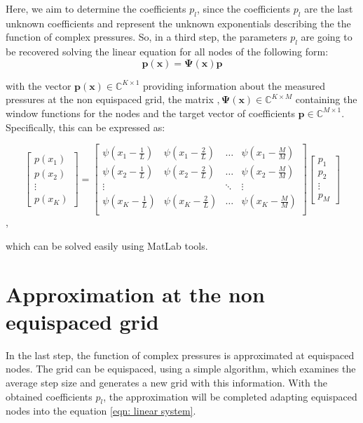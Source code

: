\documentclass[11pt]{report} %
\begin{document}
Here, we aim to determine the coefficients $p_l$, since the coefficients $p_l$ are the last unknown coefficients and represent the unknown exponentials describing the the function of complex pressures.
So, in a third step, the parameters $p_l$ are going to be recovered solving the linear equation for all nodes of the following form: 
\begin{equation}
\bm{p(x)} = \bm{\Psi (x)} \bm{p}
\end{equation}

with the  vector $\bm{p(x)} \in \mathbb{C}^{K \times 1}$ providing information about the measured pressures at the non equispaced grid, the matrix $,\bm{\Psi (x)} \in \mathbb{C}^{K \times M}$ containing the window functions for the nodes  and the target vector of coefficients $\bm{p} \in \mathbb{C}^{M \times 1}$.
Specifically, this can be expressed as: 

\[
\begin{bmatrix}
	p(x_1) \\
	p(x_2) \\
	\vdots\\
	p(x_K)
\end{bmatrix} = 
\begin{bmatrix}
    \psi(x_{1}-\frac{1}{L})& \psi(x_{1}-\frac{2}{L})& \dots & \psi(x_{1}-\frac{M}{M}) \\
    \psi(x_{2}-\frac{1}{L})& \psi(x_{2}-\frac{2}{L})& \dots & \psi(x_{2}-\frac{M}{M}) \\
    \vdots &  &\ddots & \vdots \\
    \psi(x_{K}-\frac{1}{L})& \psi(x_{K}-\frac{2}{L})& \dots & \psi(x_{K}-\frac{M}{M}) \\   
\end{bmatrix}
\begin{bmatrix}
    p_1 \\
    p_2 \\
    \vdots \\
    p_{M}
\end{bmatrix}
\],

which can be solved easily using MatLab tools.

\section{Approximation at the non equispaced grid}
In the last step, the function of complex pressures is approximated at equispaced nodes. The grid can be equispaced, using a simple algorithm, which examines the average step size and generates a new grid with this information.
With the obtained coefficients $p_l$, the approximation will be completed adapting equispaced nodes into the equation \eqref{eqn: linear system}. 
\end{document}
